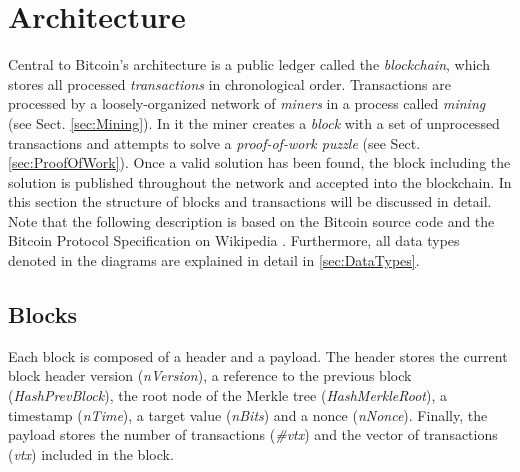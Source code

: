 \section{Architecture} \label{sec:Architecture}
Central to Bitcoin's architecture is a public ledger called the \emph{blockchain}, which stores all processed \emph{transactions} in chronological order. Transactions are processed by a loosely-organized network of \emph{miners} in a process called \emph{mining} (see Sect. \ref{sec:Mining}). In it the miner creates a \emph{block} with a set of unprocessed transactions and attempts to solve a \emph{proof-of-work puzzle} (see Sect. \ref{sec:ProofOfWork}). Once a valid solution has been found, the block including the solution is published throughout the network and accepted into the blockchain. In this section the structure of blocks and transactions will be discussed in detail. Note that the following description is based on the Bitcoin source code \cite{BitcoinSourceCode} and the Bitcoin Protocol Specification on Wikipedia \cite{Wikipedia_ProtocolSpec}. Furthermore, all data types denoted in the diagrams are explained in detail in \ref{sec:DataTypes}.

\subsection{Blocks} \label{sec:Blocks}
Each block is composed of a header and a payload. The header stores the current block header version (\textit{nVersion}), a reference to the previous block (\textit{HashPrevBlock}), the root node of the Merkle tree (\textit{HashMerkleRoot}), a timestamp (\textit{nTime}), a target value  (\textit{nBits}) and a nonce (\textit{nNonce}). Finally, the payload stores the number of transactions (\textit{\#vtx}) and the vector of transactions (\textit{vtx}) included in the block.

